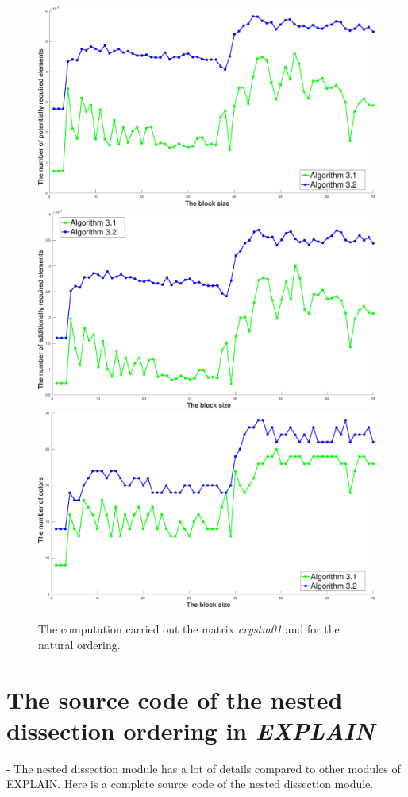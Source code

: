 \documentclass[12pt, twoside,a4paper,toc=bibliography]{scrbook}
\begin{document}
\begin{figure}
\centering
\includegraphics[width=0.75\linewidth]{crystm01_alg31_alg32_bls_nat_pot}
\includegraphics[width=0.75\linewidth]{crystm01_alg31_alg32_bls_nat_add}
\includegraphics[width=0.75\linewidth]{crystm01_alg31_alg32_bls_nat_cols}
\caption{The computation carried  out the matrix \textit{crystm01} and for the natural ordering.}
\label{crystm01_alg31_alg32_bls_nat}
\end{figure}

\clearpage
\section{The source code of the nested dissection ordering in \emph{EXPLAIN}}
\label{app.source}-
The nested dissection module has a lot of details compared to other modules of EXPLAIN.
Here is a complete source code of the nested dissection module.
\end{document}
